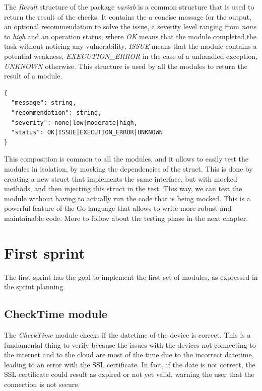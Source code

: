 The \textit{Result} structure of the package \textit{variab} is a common structure that is used to return the result of the checks. It contains the a concise message for the output, an optional recommendation to solve the issue, a severity level ranging from \textit{none} to \textit{high} and an operation status, where \textit{OK} means that the module completed the task without noticing any vulnerability, \textit{ISSUE} means that the module contains a potential weakness, \textit{EXECUTION\_ERROR} in the case of a unhandled exception, \textit{UNKNOWN} otherwise. This structure is used by all the modules to return the result of a module.

\begin{lstlisting}[style=json, caption={Result struct}]
{
  "message": string,
  "recommendation": string,
  "severity": none|low|moderate|high,
  "status": OK|ISSUE|EXECUTION_ERROR|UNKNOWN
}
\end{lstlisting}

This composition is common to all the modules, and it allows to easily test the modules in isolation, by mocking the dependencies of the struct. This is done by creating a new struct that implements the same interface, but with mocked methods, and then injecting this struct in the test. This way, we can test the module without having to actually run the code that is being mocked. This is a powerful feature of the Go language that allows to write more robust and maintainable code. More to follow about the testing phase in the next chapter.

\section{First sprint}

The first sprint has the goal to implement the first set of modules, as expressed in the sprint planning.

\subsection{CheckTime module}

The \textit{CheckTime} module checks if the datetime of the device is correct. This is a fundamental thing to verify because the issues with the devices not connecting to the internet and to the cloud are most of the time due to the incorrect datetime, leading to an error with the SSL certificate. In fact, if the date is not correct, the SSL certificate could result as expired or not yet valid, warning the user that the connection is not secure.

